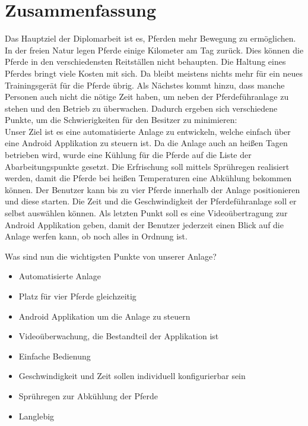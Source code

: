 \section*{Zusammenfassung}
\label{sec:zusammenfassungMain}

Das Hauptziel der Diplomarbeit ist es, Pferden mehr Bewegung zu ermöglichen. In der freien Natur legen Pferde einige Kilometer am Tag zurück. Dies können die Pferde in den verschiedensten Reitställen nicht behaupten. Die Haltung eines Pferdes bringt viele Kosten mit sich. Da bleibt meistens nichts mehr für ein neues Trainingsgerät für die Pferde übrig. Als Nächstes kommt hinzu, dass manche Personen auch nicht die nötige Zeit haben, um neben der Pferdeführanlage zu stehen und den Betrieb zu überwachen. Dadurch ergeben sich verschiedene Punkte, um die Schwierigkeiten für den Besitzer zu minimieren: \\
Unser Ziel ist es eine automatisierte Anlage zu entwickeln, welche einfach über eine Android Applikation zu steuern ist. Da die Anlage auch an heißen Tagen betrieben wird, wurde eine Kühlung für die Pferde auf die Liste der Abarbeitungspunkte gesetzt. Die Erfrischung soll mittels Sprühregen realisiert werden, damit die Pferde bei heißen Temperaturen eine Abkühlung bekommen können. Der Benutzer kann bis zu vier Pferde innerhalb der Anlage positionieren und diese starten. Die Zeit und die Geschwindigkeit der Pferdeführanlage soll er selbst auswählen können. Als letzten Punkt soll es eine Videoübertragung zur Android Applikation geben, damit der Benutzer jederzeit einen Blick auf die Anlage werfen kann, ob noch alles in Ordnung ist.  \newline{}
 
Was sind nun die wichtigsten Punkte von unserer Anlage?\\

\begin{itemize}
\item{Automatisierte Anlage}
\item{Platz für vier Pferde gleichzeitig}
\item{Android Applikation um die Anlage zu steuern}
\item{Videoüberwachung, die Bestandteil der Applikation ist}
\item{Einfache Bedienung}
\item{Geschwindigkeit und Zeit sollen individuell konfigurierbar sein} 
\item{Sprühregen zur Abkühlung der Pferde}
\item{Langlebig}
\end{itemize}

